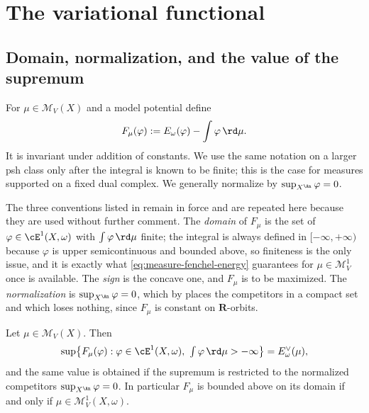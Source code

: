 \section{The variational functional}
\label{sec:ch28-variational}

\subsection{Domain, normalization, and the value of the supremum}
\label{sec:ch28-domain}

For \(\mu\in\mathcal M_V(X)\) and a model potential define
\begin{equation}
\label{eq:variational-functional}
                  F_\mu(\varphi)
                  :=E_\omega(\varphi)-\int\varphi\,\rd \mu.
\end{equation}
It is invariant under addition of constants.  We use the same notation on a
larger psh class only after the integral is known to be finite; this is the
case for measures supported on a fixed dual complex.  We generally
normalize by \(\sup_{X^{\An}}\varphi=0\).

The three conventions listed in 
remain in force and are repeated here because they are used without further
comment.  The \emph{domain} of \(F_\mu\) is the set of
\(\varphi\in\cE^1(X,\omega)\) with \(\int\varphi\,\rd\mu\) finite; the
integral is always defined in \([-\infty,+\infty)\) because \(\varphi\) is
upper semicontinuous and bounded above, so finiteness is the only issue, and
it is exactly what
\eqref{eq:measure-fenchel-energy} guarantees for
\(\mu\in\mathcal M^1_V\) once  is available.  The
\emph{sign} is the concave one, and \(F_\mu\) is to be maximized.  The
\emph{normalization} is \(\sup_{X^{\An}}\varphi=0\), which by
 places the competitors in a compact set and
which loses nothing, since \(F_\mu\) is constant on
\(\mathbf R\)-orbits.

\begin{proposition}
\label{prop:ch28-sup-is-dual-energy}
Let \(\mu\in\mathcal M_V(X)\).  Then
\begin{equation}
\label{eq:ch28-sup-is-dual-energy}
 \sup\bigl\{F_\mu(\varphi):\varphi\in\cE^1(X,\omega),\
   \textstyle\int\varphi\,\rd\mu>-\infty\bigr\}
 =E^\vee_\omega(\mu),
\end{equation}
and the same value is obtained if the supremum is restricted to the
normalized competitors \(\sup_{X^{\An}}\varphi=0\).  In particular \(F_\mu\)
is bounded above on its domain if and only if
\(\mu\in\mathcal M^1_V(X,\omega)\).
\end{proposition}

